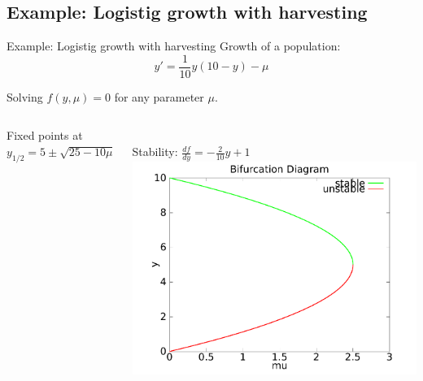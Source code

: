 \documentclass{beamer}
\begin{document}
\subsection{Example: Logistig growth with harvesting}
\begin{frame}{Example: Logistig growth with harvesting}
    Growth of a population:
    $$y' = \frac{1}{10}y(10 - y) - \mu $$

    Solving $f(y,\mu) = 0$ for any parameter $\mu$. 
     \pause
     \begin{columns}
            Fixed points at $y_{1/2} = 5 \pm \sqrt{25 - 10 \mu}$
            
            ~\\
            
            Stability: $\frac{df}{dy} = -\frac{2}{10} y + 1$
            \includegraphics[width=1\textwidth]{grafik/harvesting}
    \end{columns}
\end{frame}

\end{document}
